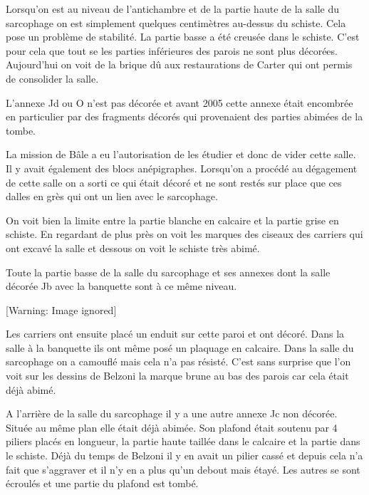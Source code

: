 \documentclass{article}
\begin{document}
Lorsqu’on est au niveau de l’antichambre et de la partie haute de la
salle du sarcophage on est simplement quelques centimètres au-dessus du
schiste. Cela pose un problème de stabilité. La partie basse a été
creusée dans le schiste. C’est pour cela que tout se les parties
inférieures des parois ne sont plus décorées. Aujourd’hui on voit de la
brique dû aux restaurations de Carter qui ont permis de consolider la
salle. 

L’annexe Jd ou O n’est pas décorée et avant 2005 cette annexe était
encombrée en particulier par des fragments décorés qui provenaient des
parties abimées de la tombe. 

La mission de Bâle a eu l’autorisation de les étudier et donc de vider
cette salle. Il y avait également des blocs anépigraphes. Lorsqu’on a
procédé au dégagement de cette salle on a sorti ce qui était décoré et
ne sont restés sur place que ces dalles en grès qui ont un lien avec le
sarcophage.  

On voit bien la limite entre la partie blanche en calcaire et la partie
grise en schiste. En regardant de plus près on voit les marques des
ciseaux des carriers qui ont excavé la salle et dessous on voit le
schiste très abimé.

Toute la partie basse de la salle du sarcophage et ses annexes dont la
salle décorée Jb avec la banquette sont à ce même niveau. 

  [Warning: Image ignored] %
 

Les carriers ont ensuite placé un enduit sur cette paroi et ont décoré.
Dans la salle à la banquette ils ont même posé un plaquage en calcaire.
Dans la salle du sarcophage on a camouflé mais cela n’a pas résisté.
C’est sans surprise que l’on voit sur les dessins de Belzoni la marque
brune au bas des parois car cela était déjà abimé.

A l’arrière de la salle du sarcophage il y a une autre annexe Jc non
décorée. Située au même plan elle était déjà abimée. Son plafond était
soutenu par 4 piliers placés en longueur, la partie haute taillée dans
le calcaire et la partie dans le schiste. Déjà du temps de Belzoni il y
en avait un pilier cassé et depuis cela n’a fait que s’aggraver et il
n’y en a plus qu’un debout mais étayé. Les autres se sont écroulés et
une partie du plafond est tombé. 
\end{document}
